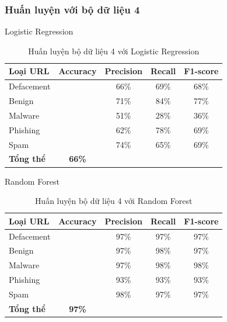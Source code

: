 \documentclass[13pt]{article}
\begin{document}
\subsubsection{Huấn luyện với bộ dữ liệu 4}
Logistic Regression
\begin{table}[h]
    \centering
    \renewcommand{\arraystretch}{1.3} %
    \begin{tabular}{|l|c|c|c|c|}
        \hline
        \rowcolor[HTML]{C0C0C0} %
        \textbf{Loại URL} & \textbf{Accuracy} & \textbf{Precision} & \textbf{Recall} & \textbf{F1-score} \\ 
        \hline
        Defacement &  & 66\% & 69\% & 68\% \\ 
        \hline
        Benign &  & 71\% & 84\% & 77\% \\ 
        \hline
        Malware &  & 51\% & 28\% & 36\% \\ 
        \hline
        Phishing &  & 62\% & 78\% & 69\% \\ 
        \hline
        Spam &  & 74\% & 65\% & 69\% \\ 
        \hline
        \textbf{Tổng thể} & \textbf{66\%} &  &  &  \\ 
        \hline
    \end{tabular}
    \caption{Huấn luyện bộ dữ liệu 4 với Logistic Regression}
    \label{tab:logistic_regression}
\end{table}

Random Forest
\newpage
\begin{table}[h]
    \centering
    \renewcommand{\arraystretch}{1.3} %
    \begin{tabular}{|l|c|c|c|c|}
        \hline
        \rowcolor[HTML]{C0C0C0} %
        \textbf{Loại URL} & \textbf{Accuracy} & \textbf{Precision} & \textbf{Recall} & \textbf{F1-score} \\ 
        \hline
        Defacement &  & 97\% & 97\% & 97\% \\ 
        \hline
        Benign &  & 97\% & 98\% & 97\% \\ 
        \hline
        Malware &  & 97\% & 98\% & 98\% \\ 
        \hline
        Phishing &  & 93\% & 93\% & 93\% \\ 
        \hline
        Spam &  & 98\% & 97\% & 97\% \\ 
        \hline
        \textbf{Tổng thể} & \textbf{97\%} &  &  &  \\ 
        \hline
    \end{tabular}
    \caption{Huấn luyện bộ dữ liệu 4 với Random Forest}
    \label{tab:logistic_regression}
\end{table}
\end{document}
